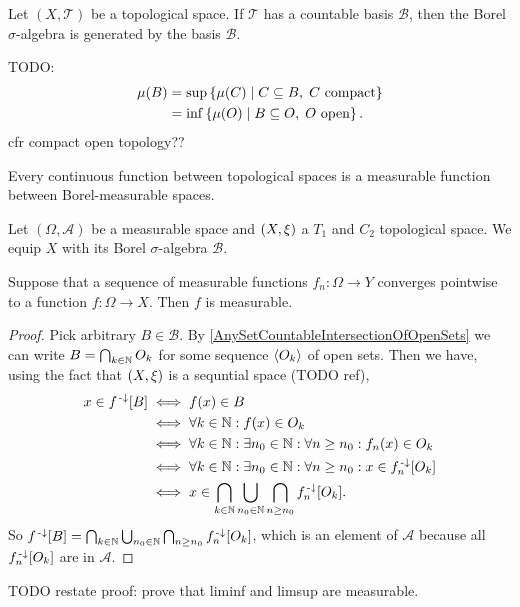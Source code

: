 \begin{lemma}
Let $(X,\mathcal{T})$ be a topological space. If $\mathcal{T}$ has a countable basis $\mathcal{B}$, then the Borel $\sigma$-algebra is generated by the basis $\mathcal{B}$.
\end{lemma}

TODO:
\begin{align*}
\mu(B) &= \sup\left\{ \mu(C) \;\middle|\; C\subseteq B, \; \text{$C$ compact} \right\} \\
&= \inf\left\{ \mu(O) \;\middle|\; B\subseteq O, \; \text{$O$ open} \right\}.
\end{align*}
cfr compact open topology??

\begin{lemma}
Every continuous function between topological spaces is a measurable function between Borel-measurable spaces.
\end{lemma}

\begin{proposition} \label{pointWiseConvergenceMeasurable}
Let $(\Omega,\mathcal{A})$ be a measurable space and $\left( X,\xi \right)$ a $T_1$ and $C_2$ topological space. We equip $X$ with its Borel $\sigma$-algebra $\mathcal{B}$.

Suppose that a sequence of measurable functions $f_n : \Omega \to Y$ converges pointwise to a function $f:\Omega\to X$. Then $f$ is measurable.
\end{proposition}
\begin{proof}
Pick arbitrary $B\in \mathcal{B}$. By \ref{AnySetCountableIntersectionOfOpenSets} we can write $B = \bigcap_{k\in\mathbb{N}}O_k$ for some sequence $\left\langle O_k \right\rangle$ of open sets. Then we have, using the fact that $\left( X,\xi \right)$ is a sequntial space (TODO ref),
\begin{align*}
x\in f^{{\text{\hspace{0.15em}-}\downarrow}}[B] &\iff f(x)\in B \\
&\iff \forall k\in\mathbb{N}: f(x)\in O_k\\
&\iff \forall k\in\mathbb{N}: \exists n_0\in\mathbb{N}: \forall n\geq n_0: f_n(x)\in O_k \\
&\iff \forall k\in\mathbb{N}: \exists n_0\in\mathbb{N}: \forall n\geq n_0: x\in f^{{\text{\hspace{0.15em}-}\downarrow}}_n[O_k] \\
&\iff x\in \bigcap_{k\in\mathbb{N}}\bigcup_{n_0\in\mathbb{N}}\bigcap_{n\geq n_0}f^{{\text{\hspace{0.15em}-}\downarrow}}_n[O_k].
\end{align*}
So $f^{{\text{\hspace{0.15em}-}\downarrow}}[B] = \bigcap_{k\in\mathbb{N}}\bigcup_{n_0\in\mathbb{N}}\bigcap_{n\geq n_0}f^{{\text{\hspace{0.15em}-}\downarrow}}_n[O_k]$, which is an element of $\mathcal{A}$ because all $f^{{\text{\hspace{0.15em}-}\downarrow}}_n[O_k]$ are in $\mathcal{A}$.
\end{proof}
TODO restate proof: prove that liminf and limsup are measurable.

